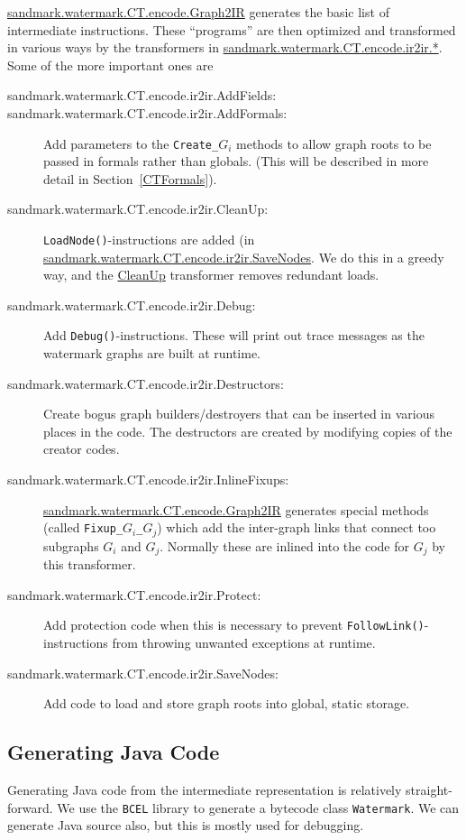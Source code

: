 \url{sandmark.watermark.CT.encode.Graph2IR} generates the basic list of 
intermediate instructions. These ``programs'' are then optimized 
and transformed in various ways by the transformers in 
\url{sandmark.watermark.CT.encode.ir2ir.*}. Some of the more important ones
are 
\begin{description}
   \item[sandmark.watermark.CT.encode.ir2ir.AddFields:]
   \item[sandmark.watermark.CT.encode.ir2ir.AddFormals:] 
       Add parameters to the {\tt Create\_$G_i$}
       methods to allow graph roots to be passed
       in formals rather than globals. (This will be
       described in more detail in Section~\ref{CTFormals}).
   \item[sandmark.watermark.CT.encode.ir2ir.CleanUp:]
       {\tt LoadNode()}-instructions are added
       (in \url{sandmark.watermark.CT.encode.ir2ir.SaveNodes}.
       We do this in a greedy way, and the 
       \url{CleanUp} transformer removes redundant
       loads.
   \item[sandmark.watermark.CT.encode.ir2ir.Debug:]
       Add {\tt Debug()}-instructions. These will
       print out trace messages as the watermark graphs
       are built at runtime.
   \item[sandmark.watermark.CT.encode.ir2ir.Destructors:]
       Create bogus graph builders/destroyers that
       can be inserted in various places in the code.
       The destructors are created by modifying copies
       of the creator codes.
   \item[sandmark.watermark.CT.encode.ir2ir.InlineFixups:]
       \url{sandmark.watermark.CT.encode.Graph2IR} generates special
       methods (called {\tt Fixup\_$G_i$\_$G_j$}) which add the
       inter-graph links that connect too subgraphs $G_i$ and $G_j$.
       Normally these are inlined into the code for $G_j$ by this
       transformer.
   \item[sandmark.watermark.CT.encode.ir2ir.Protect:]
       Add protection code when this is necessary to prevent
       {\tt FollowLink()}-instructions from throwing unwanted
       exceptions at runtime.
   \item[sandmark.watermark.CT.encode.ir2ir.SaveNodes:]
       Add code to load and store graph roots into global, static
       storage.
\end{description}


\subsection{Generating Java Code}
Generating Java code from the intermediate representation
is relatively straight-forward. We use the {\tt BCEL}
library to generate a bytecode class {\tt Watermark}.
We can generate Java source also, but this is mostly
used for debugging.

